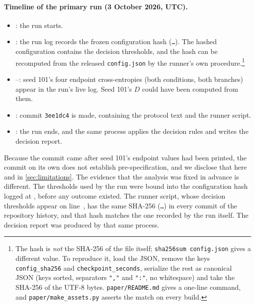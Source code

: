 \documentclass[11pt]{article}
\begin{document}
\paragraph{Timeline of the primary run (3 October 2026, UTC).}
\begin{itemize}[leftmargin=1.4em,itemsep=1pt]
  \item \sessionStartTime: the run starts.
  \item \logConfigTime: the run log records the frozen configuration hash (\texttt{\configSha\ldots}). The
        hashed configuration contains the decision thresholds, and the hash can be recomputed from the released
        \texttt{config.json} by the runner's own procedure.\footnote{The hash is \emph{not} the SHA-256 of the
        file itself; \texttt{sha256sum config.json} gives a different value. To reproduce it, load the JSON, remove
        the keys \texttt{config\_sha256} and \texttt{checkpoint\_seconds}, serialize the rest as canonical JSON
        (keys sorted, separators \texttt{","} and \texttt{":"}, no whitespace) and take the SHA-256 of the UTF-8
        bytes. \texttt{paper/README.md} gives a one-line command, and \texttt{paper/make\_assets.py} asserts the
        match on every build.}
  \item \seedOneFirst--\seedOneLast: seed 101's four endpoint cross-entropies (both conditions, both branches)
        appear in the run's live log. Seed 101's $D$ could have been computed from them.
  \item \commitTime: commit \texttt{3ee1dc4} is made, containing the protocol text and the runner script.
  \item \sessionEndTime: the run ends, and the same process applies the decision rules and writes the decision
        report.
\end{itemize}
Because the commit came after seed 101's endpoint values had been printed, the commit on its own does not
establish pre-specification, and we disclose that here and in \cref{sec:limitations}. The evidence that the
analysis was fixed in advance is different. The thresholds used by the run were bound into the configuration
hash logged at \logConfigTime, before any outcome existed. The runner script, whose decision thresholds appear on
line~\thresholdLine, has the same SHA-256 (\texttt{\runnerSha\ldots}) in every commit of the repository history,
and that hash matches the one recorded by the run itself. The decision report was produced by that same process.
\end{document}
